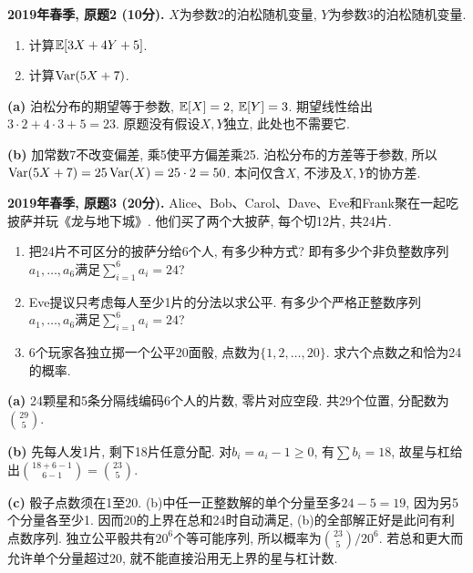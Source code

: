 \begin{exercise}\label{ex:m1-2019s-q2}
\textbf{2019年春季, 原题2 (10分).} $X$为参数2的泊松随机变量, $Y$为参数3的泊松随机变量.
\begin{enumerate}\item[(a)]\label{ex:m1-2019s-q2-a} 计算$\mathbb E[3X+4Y+5]$.\item[(b)]\label{ex:m1-2019s-q2-b} 计算$\operatorname{Var}(5X+7)$.\end{enumerate}
\end{exercise}
\begin{solution}
\textbf{(a)}\label{sol:m1-2019s-q2-a} 泊松分布的期望等于参数, $\mathbb E[X]=2$, $\mathbb E[Y]=3$. 期望线性给出$3\cdot2+4\cdot3+5=23$. 原题没有假设$X,Y$独立, 此处也不需要它.

\textbf{(b)}\label{sol:m1-2019s-q2-b} 加常数7不改变偏差, 乘5使平方偏差乘25. 泊松分布的方差等于参数, 所以$\operatorname{Var}(5X+7)=25\operatorname{Var}(X)=25\cdot2=50$. 本问仅含$X$, 不涉及$X,Y$的协方差.
\end{solution}

\begin{exercise}\label{ex:m1-2019s-q3}
\textbf{2019年春季, 原题3 (20分).} Alice、Bob、Carol、Dave、Eve和Frank聚在一起吃披萨并玩《龙与地下城》. 他们买了两个大披萨, 每个切12片, 共24片.
\begin{enumerate}
\item[(a)]\label{ex:m1-2019s-q3-a} 把24片不可区分的披萨分给6个人, 有多少种方式? 即有多少个非负整数序列$a_1,\ldots,a_6$满足$\sum_{i=1}^6a_i=24$?
\item[(b)]\label{ex:m1-2019s-q3-b} Eve提议只考虑每人至少1片的分法以求公平. 有多少个严格正整数序列$a_1,\ldots,a_6$满足$\sum_{i=1}^6a_i=24$?
\item[(c)]\label{ex:m1-2019s-q3-c} 6个玩家各独立掷一个公平20面骰, 点数为$\{1,2,\ldots,20\}$. 求六个点数之和恰为24的概率.
\end{enumerate}
\end{exercise}
\begin{solution}
\textbf{(a)}\label{sol:m1-2019s-q3-a} 24颗星和5条分隔线编码6个人的片数, 零片对应空段. 共29个位置, 分配数为$\binom{29}{5}$.

\textbf{(b)}\label{sol:m1-2019s-q3-b} 先每人发1片, 剩下18片任意分配. 对$b_i=a_i-1\ge0$, 有$\sum b_i=18$, 故星与杠给出$\binom{18+6-1}{6-1}=\binom{23}{5}$.

\textbf{(c)}\label{sol:m1-2019s-q3-c} 骰子点数须在1至20. (b)中任一正整数解的单个分量至多$24-5=19$, 因为另5个分量各至少1. 因而20的上界在总和24时自动满足, (b)的全部解正好是此问有利点数序列. 独立公平骰共有$20^6$个等可能序列, 所以概率为$\binom{23}{5}/20^6$. 若总和更大而允许单个分量超过20, 就不能直接沿用无上界的星与杠计数.
\end{solution}

